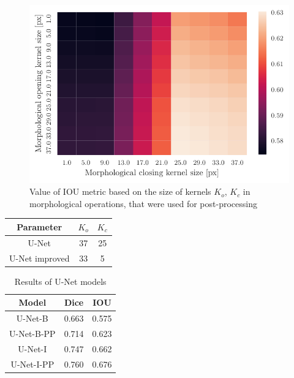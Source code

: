 \begin{figure}[H]
    \centering
    \includegraphics[]{images/heatmap_of_unetpostproc_search.pdf}
    \caption{Value of IOU metric based on the size of kernels $K_o$, $K_c$ in morphological operations, that were used for post-processing}
    \label{fig:heatmap_postprocess}
\end{figure}

\begin{table}[H]
    \centering
    \begin{tabular}{|c|c|c|}
        \hline
        Parameter      & $K_o$ & $K_c$ \\ \hline
        U-Net          & 37    & 25    \\ \hline
        U-Net improved & 33    & 5     \\ \hline
    \end{tabular}
\end{table}

\begin{table}[H]
    \centering
    \begin{tabular}{|c|c|c|}
        \hline
        Model      & Dice  & IOU   \\ \hline
        U-Net-B    & 0.663 & 0.575 \\ \hline
        U-Net-B-PP & 0.714 & 0.623 \\ \hline
        U-Net-I    & 0.747 & 0.662 \\ \hline
        U-Net-I-PP & 0.760 & 0.676 \\ \hline
    \end{tabular}
    \caption{Results of U-Net models}
\end{table}


